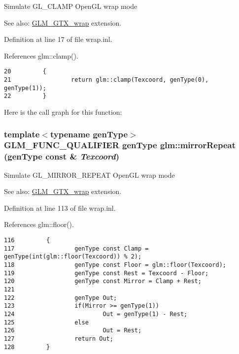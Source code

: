 Simulate GL\_\-CLAMP OpenGL wrap mode \begin{Desc}
\item[See also:]\hyperlink{group__gtx__wrap}{GLM\_\-GTX\_\-wrap} extension. \end{Desc}


Definition at line 17 of file wrap.inl.

References glm::clamp().

\begin{Code}\begin{verbatim}20         {
21                 return glm::clamp(Texcoord, genType(0), genType(1));
22         }
\end{verbatim}
\end{Code}




Here is the call graph for this function:\hypertarget{group__gtx__wrap_g03ce460f4f1bbc3058ce0d4928e29071}{
\subsubsection[mirrorRepeat]{\setlength{\rightskip}{0pt plus 5cm}template$<$typename genType$>$ GLM\_\-FUNC\_\-QUALIFIER genType glm::mirrorRepeat (genType const \& {\em Texcoord})}}
\label{group__gtx__wrap_g03ce460f4f1bbc3058ce0d4928e29071}


Simulate GL\_\-MIRROR\_\-REPEAT OpenGL wrap mode \begin{Desc}
\item[See also:]\hyperlink{group__gtx__wrap}{GLM\_\-GTX\_\-wrap} extension. \end{Desc}


Definition at line 113 of file wrap.inl.

References glm::floor().

\begin{Code}\begin{verbatim}116         {
117                 genType const Clamp = genType(int(glm::floor(Texcoord)) % 2);
118                 genType const Floor = glm::floor(Texcoord);
119                 genType const Rest = Texcoord - Floor;
120                 genType const Mirror = Clamp + Rest;
121 
122                 genType Out;
123                 if(Mirror >= genType(1))
124                         Out = genType(1) - Rest;
125                 else
126                         Out = Rest;
127                 return Out;
128         }
\end{verbatim}
\end{Code}




